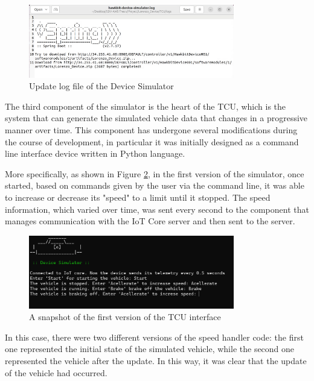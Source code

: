 \begin{figure}[h]  %
    \centering
    \includegraphics[width=0.8\textwidth]{images/update_log_HDS.png}  %
    \caption{Update log file of the Device Simulator}
    \label{fig:update_log_HDS}
\end{figure} 

The third component of the simulator is the heart of the TCU, which is the system that can generate the simulated vehicle data that changes in a progressive manner over time. This component has undergone several modifications during the course of development, in particular it was initially designed as a command line interface device written in Python language.

More specifically, as shown in Figure \ref{fig:telemetryV1}, in the first version of the simulator, once started, based on commands given by the user via the command line, it was able to increase or decrease its "speed" to a limit until it stopped. The speed information, which varied over time, was sent every second to the component that manages communication with the IoT Core server and then sent to the server.

\begin{figure}[h]  %
    \centering
    \includegraphics[width=0.8\textwidth]{images/telemetryV1.png}  %
    \caption{A snapshot of the first version of the TCU interface}
    \label{fig:telemetryV1}
\end{figure} 

In this case, there were two different versions of the speed handler code: the first one represented the initial state of the simulated vehicle, while the second one represented the vehicle after the update. In this way, it was clear that the update of the vehicle had occurred.

